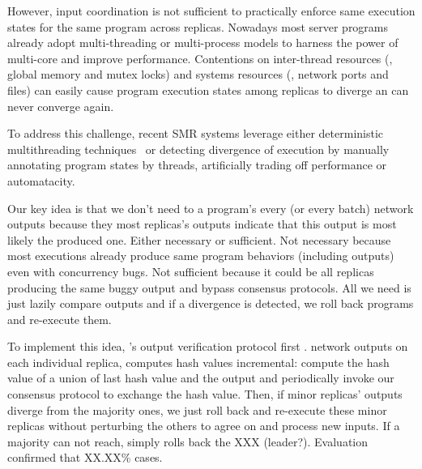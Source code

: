 
However, input coordination is not sufficient to practically enforce same 
execution states for the same program across replicas. Nowadays most server 
programs already adopt multi-threading or multi-process models to harness the 
power of multi-core and improve performance. Contentions on inter-thread 
resources (\eg, global memory and \pthread mutex locks) and systems resources 
(\eg, network ports and files) can easily cause program execution states among 
replicas to diverge an can never converge again. 

To address this challenge, recent SMR systems leverage either deterministic 
multithreading techniques~\cite{rex:eurosys14,crane:sosp15} or detecting 
divergence of execution by manually annotating program states by threads, 
artificially trading off performance or automatacity.


Our key idea is that we don't need to a program's every (or every batch) 
network outputs because they most replicas's outputs indicate that this output 
is most likely the produced one. Either necessary or sufficient. Not necessary 
because most executions already produce same program behaviors (including 
outputs) even with concurrency bugs. Not sufficient because it could be all 
replicas producing the same buggy output and bypass consensus protocols. All we 
need is just lazily compare outputs and if a divergence is detected, we roll 
back programs and re-execute them.

To implement this idea, \xxx's output verification protocol first . network 
outputs on each individual replica, computes  hash values incremental:
compute the hash value of a union of last hash value and the output  and 
periodically invoke our \paxos consensus protocol to exchange the hash value. 
Then, if minor replicas' outputs diverge from the majority ones, we just roll 
back and re-execute these minor replicas without perturbing the others to agree 
on and process new inputs. If a majority can not reach, \xxx simply rolls back 
the XXX (leader?). Evaluation confirmed that XX.XX\% cases.


